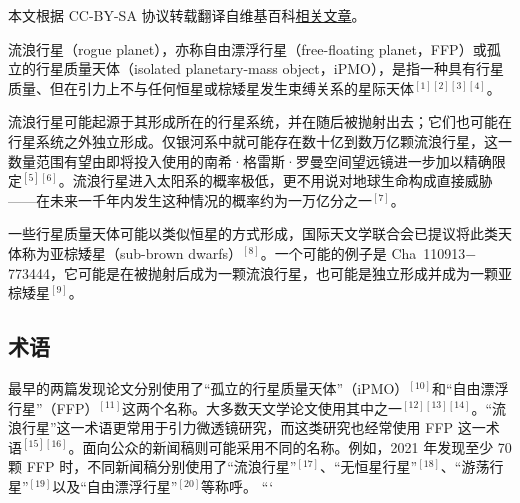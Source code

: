 
本文根据 CC-BY-SA 协议转载翻译自维基百科\href{https://en.wikipedia.org/wiki/Rogue_planet}{相关文章}。

流浪行星（rogue planet），亦称自由漂浮行星（free-floating planet，FFP）或孤立的行星质量天体（isolated planetary-mass object，iPMO），是指一种具有行星质量、但在引力上不与任何恒星或棕矮星发生束缚关系的星际天体$^{[1][2][3][4]}$。

流浪行星可能起源于其形成所在的行星系统，并在随后被抛射出去；它们也可能在行星系统之外独立形成。仅银河系中就可能存在数十亿到数万亿颗流浪行星，这一数量范围有望由即将投入使用的南希·格雷斯·罗曼空间望远镜进一步加以精确限定$^{[5][6]}$。流浪行星进入太阳系的概率极低，更不用说对地球生命构成直接威胁——在未来一千年内发生这种情况的概率约为一万亿分之一$^{[7]}$。

一些行星质量天体可能以类似恒星的方式形成，国际天文学联合会已提议将此类天体称为亚棕矮星（sub-brown dwarfs）$^{[8]}$。一个可能的例子是 Cha~110913$-$773444，它可能是在被抛射后成为一颗流浪行星，也可能是独立形成并成为一颗亚棕矮星$^{[9]}$。
\subsection{术语}
最早的两篇发现论文分别使用了“孤立的行星质量天体”（iPMO）$^{[10]}$和“自由漂浮行星”（FFP）$^{[11]}$这两个名称。大多数天文学论文使用其中之一$^{[12][13][14]}$。“流浪行星”这一术语更常用于引力微透镜研究，而这类研究也经常使用 FFP 这一术语$^{[15][16]}$。面向公众的新闻稿则可能采用不同的名称。例如，2021 年发现至少 70 颗 FFP 时，不同新闻稿分别使用了“流浪行星”$^{[17]}$、“无恒星行星”$^{[18]}$、“游荡行星”$^{[19]}$以及“自由漂浮行星”$^{[20]}$等称呼。
```
